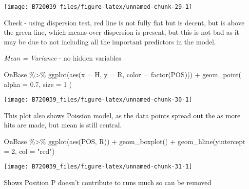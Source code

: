 \documentclass[
]{article}
\newenvironment{Shaded}{\begin{snugshade}}{\end{snugshade}}
\newcommand{\AttributeTok}[1]{\textcolor[rgb]{0.77,0.63,0.00}{#1}}
\newcommand{\DecValTok}[1]{\textcolor[rgb]{0.00,0.00,0.81}{#1}}
\newcommand{\FloatTok}[1]{\textcolor[rgb]{0.00,0.00,0.81}{#1}}
\newcommand{\FunctionTok}[1]{\textcolor[rgb]{0.00,0.00,0.00}{#1}}
\newcommand{\NormalTok}[1]{#1}
\newcommand{\SpecialCharTok}[1]{\textcolor[rgb]{0.00,0.00,0.00}{#1}}
\newcommand{\StringTok}[1]{\textcolor[rgb]{0.31,0.60,0.02}{#1}}
\begin{document}
\begin{center}\texttt{[image: B720039\_files/figure-latex/unnamed-chunk-29-1]} \end{center}

Check - using dispersion test, red line is not fully flat but is decent,
but is above the green line, which means over dispersion is present, but
this is not bad as it may be due to not including all the important
predictors in the model.

\emph{Mean = Variance} - no hidden variables

\begin{Shaded}
\begin{Highlighting}[]
\NormalTok{OnBase }\SpecialCharTok{\%\textgreater{}\%}
  \FunctionTok{ggplot}\NormalTok{(}\FunctionTok{aes}\NormalTok{(}\AttributeTok{x =}\NormalTok{ H, }\AttributeTok{y =}\NormalTok{ R, }\AttributeTok{color =} \FunctionTok{factor}\NormalTok{(POS))) }\SpecialCharTok{+}
  \FunctionTok{geom\_point}\NormalTok{(}
    \AttributeTok{alpha =} \FloatTok{0.7}\NormalTok{,}
    \AttributeTok{size =} \DecValTok{1}
\NormalTok{  )}
\end{Highlighting}
\end{Shaded}

\begin{center}\texttt{[image: B720039\_files/figure-latex/unnamed-chunk-30-1]} \end{center}

This plot also shows Poission model, as the data points spread out the
as more hits are made, but mean is still central.

\begin{Shaded}
\begin{Highlighting}[]
\NormalTok{OnBase }\SpecialCharTok{\%\textgreater{}\%}
  \FunctionTok{ggplot}\NormalTok{(}\FunctionTok{aes}\NormalTok{(POS, R)) }\SpecialCharTok{+}
  \FunctionTok{geom\_boxplot}\NormalTok{() }\SpecialCharTok{+}
  \FunctionTok{geom\_hline}\NormalTok{(}\AttributeTok{yintercept =} \DecValTok{2}\NormalTok{, }\AttributeTok{col =} \StringTok{"red"}\NormalTok{)}
\end{Highlighting}
\end{Shaded}

\begin{center}\texttt{[image: B720039\_files/figure-latex/unnamed-chunk-31-1]} \end{center}

Shows Position P doesn't contribute to runs much so can be removed
\end{document}
